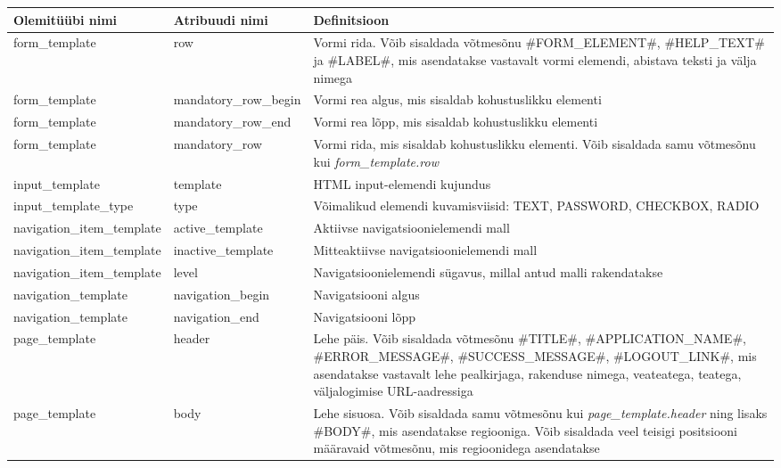 \documentclass[a4paper,12pt]{article} %
\begin{document}
\begin{table}[H]
\centering
\begin{tabular}{|p{3cm}|p{3cm}|p{9cm}|}
\hline
\rowcolor{rowgray}
Olemitüübi nimi & Atribuudi nimi & Definitsioon \\ \hline
form\_template & row & Vormi rida. Võib sisaldada võtmesõnu \#FORM\_ELEMENT\#, \#HELP\_TEXT\# ja \#LABEL\#, mis asendatakse vastavalt vormi elemendi, abistava teksti ja välja nimega \\ \hline
form\_template & mandatory\_row\newline\_begin & Vormi rea algus, mis sisaldab kohustuslikku elementi \\ \hline
form\_template & mandatory\_row\newline\_end & Vormi rea lõpp, mis sisaldab kohustuslikku elementi \\ \hline
form\_template & mandatory\_row & Vormi rida, mis sisaldab kohustuslikku elementi. Võib sisaldada samu võtmesõnu kui \textit{form\_template.row} \\ \hline
input\_template & template & HTML input-elemendi kujundus \\ \hline
input\_template\newline\_type & type & Võimalikud elemendi kuvamisviisid: TEXT, PASSWORD, CHECKBOX, RADIO \\ \hline
navigation\_item\newline\_template & active\_template & Aktiivse navigatsioonielemendi mall \\ \hline
navigation\_item\newline\_template & inactive\_template & Mitteaktiivse navigatsioonielemendi mall \\ \hline
navigation\_item\newline\_template & level & Navigatsioonielemendi sügavus, millal antud malli rakendatakse \\ \hline
navigation\newline\_template & navigation\_begin & Navigatsiooni algus \\ \hline
navigation\newline\_template & navigation\_end & Navigatsiooni lõpp \\ \hline
page\_template & header & Lehe päis. Võib sisaldada võtmesõnu \#TITLE\#, \#APPLICATION\_NAME\#, \#ERROR\_MESSAGE\#, \#SUCCESS\_MESSAGE\#, \#LOGOUT\_LINK\#, mis asendatakse vastavalt lehe pealkirjaga, rakenduse nimega, veateatega, teatega, väljalogimise URL-aadressiga \\ \hline
page\_template & body & Lehe sisuosa. Võib sisaldada samu võtmesõnu kui \textit{page\_template.header} ning lisaks  \#BODY\#, mis asendatakse regiooniga. Võib sisaldada veel teisigi positsiooni määravaid võtmesõnu, mis regioonidega asendatakse \\ \hline

\end{tabular}
\end{table}
\end{document}
